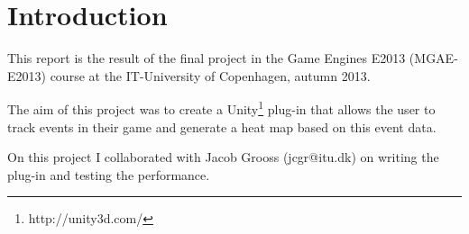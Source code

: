 \section{Introduction}
\label{Intro}
This report is the result of the final project in the Game Engines E2013 (MGAE-E2013) course at the IT-University of Copenhagen, autumn 2013. 

The aim of this project was to create a Unity\footnote{http://unity3d.com/} plug-in that allows the user to track events in their game and generate a heat map based on this event data.

On this project I collaborated with Jacob Grooss (jcgr@itu.dk) on writing the plug-in and testing the performance.
